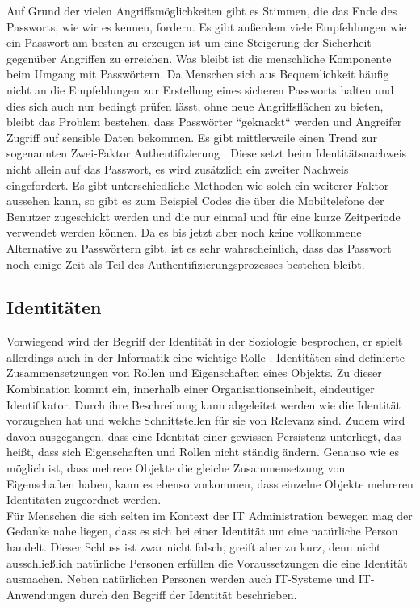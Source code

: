 \documentclass[
book,
a4paper,   
titlepage,  
halfparskip,
12pt        
]{scrartcl}
\begin{document}
\begin{onehalfspacing}
Auf Grund der vielen Angriffsmöglichkeiten gibt es Stimmen, die das Ende des Passworts, wie wir es kennen, fordern\cite{passw}. Es gibt außerdem viele Empfehlungen wie ein Passwort am besten zu erzeugen ist um eine Steigerung der Sicherheit gegenüber Angriffen zu erreichen\cite[S. 11]{passwo}. Was bleibt ist die menschliche Komponente beim Umgang mit Passwörtern. Da Menschen sich aus Bequemlichkeit häufig nicht an die Empfehlungen zur Erstellung eines sicheren Passworts halten und dies sich auch nur bedingt prüfen lässt, ohne neue Angriffsflächen zu bieten, bleibt das Problem bestehen, dass Passwörter ``geknackt`` werden und Angreifer Zugriff auf sensible Daten bekommen. Es gibt mittlerweile einen Trend zur sogenannten Zwei-Faktor Authentifizierung \cite{passw}. Diese setzt beim Identitätsnachweis nicht allein auf das Passwort, es wird zusätzlich ein zweiter Nachweis eingefordert. Es gibt unterschiedliche Methoden wie solch ein weiterer Faktor aussehen kann, so gibt es zum Beispiel Codes die über die Mobiltelefone der Benutzer zugeschickt werden und die nur einmal und für eine kurze Zeitperiode verwendet werden können. Da es bis jetzt aber noch keine vollkommene Alternative zu Passwörtern gibt, ist es sehr wahrscheinlich, dass das Passwort noch einige Zeit als Teil des Authentifizierungsprozesses bestehen bleibt.\cite{pass}

\subsection{Identitäten}
\label{subsec:ident}
Vorwiegend wird der Begriff der Identität in der Soziologie besprochen, er spielt allerdings auch in der Informatik eine wichtige Rolle \cite[S. 21]{kerberos2}. Identitäten sind definierte Zusammensetzungen von Rollen und Eigenschaften eines Objekts. Zu dieser Kombination kommt ein, innerhalb einer Organisationseinheit, eindeutiger Identifikator. Durch ihre Beschreibung kann abgeleitet werden wie die Identität vorzugehen hat und welche Schnittstellen für sie von Relevanz sind. Zudem wird davon ausgegangen, dass eine Identität einer gewissen Persistenz unterliegt, das heißt, dass sich Eigenschaften und Rollen nicht ständig ändern. Genauso wie es möglich ist, dass mehrere Objekte die gleiche Zusammensetzung von Eigenschaften haben, kann es ebenso vorkommen, dass einzelne Objekte mehreren Identitäten zugeordnet werden.\\
Für Menschen die sich selten im Kontext der \ac{IT} Administration bewegen mag der Gedanke nahe liegen, dass es sich bei einer Identität um eine natürliche Person handelt. Dieser Schluss ist zwar nicht falsch, greift aber zu kurz, denn nicht ausschließlich natürliche Personen erfüllen die Voraussetzungen die eine Identität ausmachen. Neben natürlichen Personen werden auch \ac{IT}-Systeme und \ac{IT}-Anwendungen durch den Begriff der Identität beschrieben.\cite[S. 21ff]{kerberos2}


\end{onehalfspacing}
\end{document}
